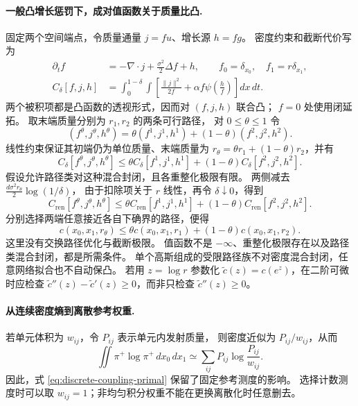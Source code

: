 \documentclass[UTF8,a4paper,11pt,fontset=fandol]{ctexart}
\begin{document}
\paragraph{一般凸增长惩罚下，成对值函数关于质量比凸.}
固定两个空间端点，令质量通量 $j=fu$、增长源 $h=fg$。
密度约束和截断代价写为
\begin{equation}
\begin{aligned}
\partial_tf&=-\nabla\cdot j+\frac{\sigma^2}{2}\Delta f+h,
\qquad f_0=\delta_{x_0},\quad f_1=r\delta_{x_1},\\
C_\delta[f,j,h]
&=\int_0^{1-\delta}\int
\left[\frac{\|j\|^2}{2f}+\alpha f\psi\!\left(\frac{h}{f}\right)\right]dx\,dt.
\end{aligned}
\end{equation}
两个被积项都是凸函数的透视形式，因而对 $(f,j,h)$ 联合凸；
$f=0$ 处使用闭延拓。
取末端质量分别为 $r_1,r_2$ 的两条可行路径，
对 $0\le\theta\le1$ 令
\begin{equation}
(f^\theta,j^\theta,h^\theta)
=\theta(f^1,j^1,h^1)+(1-\theta)(f^2,j^2,h^2).
\end{equation}
线性约束保证其初端仍为单位质量、末端质量为
$r_\theta=\theta r_1+(1-\theta)r_2$，并有
\begin{equation}
C_\delta[f^\theta,j^\theta,h^\theta]
\le\theta C_\delta[f^1,j^1,h^1]
+(1-\theta)C_\delta[f^2,j^2,h^2].
\end{equation}
假设允许路径类对这种混合封闭，且各重整化极限有限。
两侧减去 $\frac{d\sigma^2r_\theta}{2}\log(1/\delta)$，
由于扣除项关于 $r$ 线性，再令 $\delta\downarrow0$，得到
\begin{equation}
C_{\mathrm{ren}}[f^\theta,j^\theta,h^\theta]
\le\theta C_{\mathrm{ren}}[f^1,j^1,h^1]
+(1-\theta)C_{\mathrm{ren}}[f^2,j^2,h^2].
\end{equation}
分别选择两端任意接近各自下确界的路径，便得
\begin{equation}
\boxed{c(x_0,x_1,r_\theta)
\le\theta c(x_0,x_1,r_1)+(1-\theta)c(x_0,x_1,r_2).}
\label{eq:pair-ratio-convexity}
\end{equation}
这里没有交换路径优化与截断极限。
值函数不是 $-\infty$、重整化极限存在以及路径类混合封闭，都是所需条件。
单个高斯组成的受限路径族不对密度混合封闭，任意网络拟合也不自动保凸。
若用 $z=\log r$ 参数化 $\widetilde c(z)=c(e^z)$，在二阶可微时应检查
$\widetilde c''(z)-\widetilde c'(z)\ge0$，而非只检查 $\widetilde c''(z)\ge0$。

\paragraph{从连续密度熵到离散参考权重.}
若单元体积为 $w_{ij}$，令 $P_{ij}$ 表示单元内发射质量，
则密度近似为 $P_{ij}/w_{ij}$，从而
\begin{equation}
\iint\pi^+\log\pi^+\,dx_0\,dx_1
\simeq\sum_{ij}P_{ij}\log\frac{P_{ij}}{w_{ij}}.
\end{equation}
因此，式 \eqref{eq:discrete-coupling-primal} 保留了固定参考测度的影响。
选择计数测度时可以取 $w_{ij}=1$；非均匀积分权重不能在更换离散化时任意删去。
\end{document}

